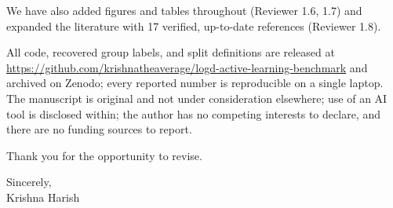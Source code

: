 \documentclass[11pt]{article}
\begin{document}
We have also added figures and tables throughout (Reviewer 1.6, 1.7) and expanded the
literature with 17 verified, up-to-date references (Reviewer 1.8).

All code, recovered group labels, and split definitions are released at
\url{https://github.com/krishnatheaverage/logd-active-learning-benchmark} and archived on
Zenodo; every reported number is reproducible on a single laptop. The manuscript is
original and not under consideration elsewhere; use of an AI tool is disclosed within;
the author has no competing interests to declare, and there are no funding sources to
report.

\vspace{1em}
\noindent Thank you for the opportunity to revise.

\vspace{1em}
\noindent Sincerely,\\
Krishna Harish
\end{document}
